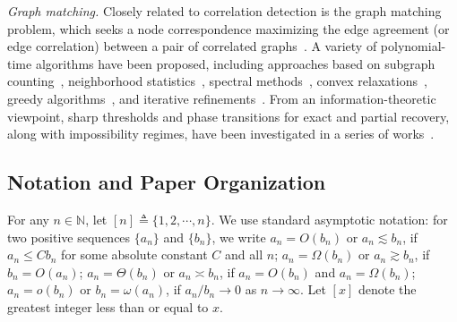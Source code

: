 \documentclass[letterpaper,11pt]{article}
\theoremstyle{definition}
\begin{document}
\emph{Graph matching.}
Closely related to correlation detection is the graph matching problem, which seeks a node correspondence maximizing the edge agreement (or edge correlation) between a pair of correlated graphs~\citep{conte2004thirty}. A variety of polynomial-time algorithms have been proposed, including approaches based on subgraph counting~\citep{mao2025random,maier2025asymmetric}, neighborhood statistics~\citep{dai2019analysis,ding2021efficient,mao2021random}, spectral methods~\citep{umeyama1988eigendecomposition,singh2008global,fan2019spectral,ganassali2022spectral}, convex relaxations~\citep{aflalo2015convex,vogelstein2015fast,varma2025graph}, greedy algorithms~\citep{du2025algorithmic}, and iterative refinements~\citep{piccioli2022aligning,ding2023polynomial,ganassali2024statistical}. From an information-theoretic viewpoint, sharp thresholds and phase transitions for exact and partial recovery, along with impossibility regimes, have been investigated in a series of works~\citep{cullina2016improved,cullina2017exact,cullina2020partial,ganassali2020tree,ganassali2021impossibility,wu2022settling,ding2023matching,du2025optimal,hall2023partial}.

\subsection{Notation and Paper Organization}

For any $n\in \mathbb{N}$, let $[n]\triangleq \{1,2,\cdots,n\}$. 
We use standard asymptotic notation: for two positive sequences $\{a_n\}$ and $\{b_n\}$, we write $a_n = O(b_n)$ or $a_n\lesssim b_n$, if $a_n\le C b_n$ for some absolute constant $C$ and all $n$; $a_n = \Omega(b_n)$ or $a_n\gtrsim b_n$, if $b_n = O(a_n)$; $a_n = \Theta(b_n)$ or $a_n\asymp b_n$, if $a_n = O(b_n)$ and $a_n = \Omega(b_n)$; $a_n = o(b_n)$ or $b_n =\omega(a_n)$, if $a_n/b_n\to 0$ as $n\to \infty$.
Let $[x]$ denote the greatest integer less than or equal to $x$.
\end{document}
